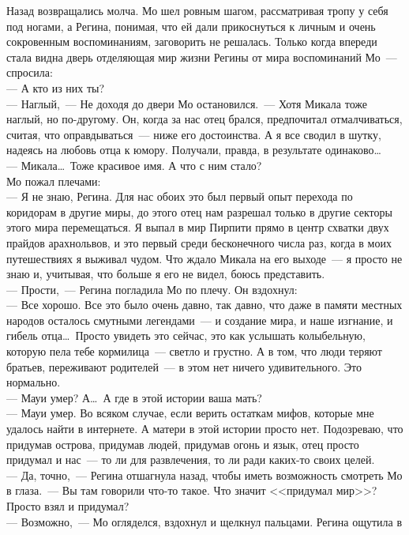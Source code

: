 Назад возвращались молча. Мо шел ровным шагом, рассматривая тропу у себя под 
ногами, а Регина, понимая, что ей дали прикоснуться к личным и очень 
сокровенным воспоминаниям, заговорить не решалась. Только когда впереди стала видна дверь 
отделяющая мир жизни Регины от мира воспоминаний Мо~--- спросила:\\
--- А кто из них ты?\\
--- Наглый,~--- Не доходя до двери Мо остановился.~--- Хотя Микала тоже наглый, 
но по-другому. Он, когда за нас отец брался, предпочитал отмалчиваться, считая, 
что оправдываться~--- ниже его достоинства. А я все сводил в шутку, надеясь на 
любовь отца к юмору. Получали, правда, в результате одинаково\ldots\\
--- Микала\ldots\ Тоже красивое имя. А что с ним стало?\\
Мо пожал плечами:\\
--- Я не знаю, Регина. Для нас обоих это был первый опыт перехода по коридорам в 
другие миры, до этого отец нам разрешал только в другие секторы этого мира 
перемещаться. Я выпал в мир Пирпити прямо в центр схватки двух прайдов 
арахнольвов, и это первый среди бесконечного числа раз, когда в моих 
путешествиях я выживал чудом. Что ждало Микала на его выходе~--- я просто не 
знаю и, учитывая, что больше я его не видел, боюсь представить.\\
--- Прости,~--- Регина погладила Мо по плечу. Он вздохнул:\\
--- Все хорошо. Все это было очень давно, так давно, что даже в памяти местных 
народов осталось смутными легендами~--- и создание мира, и наше изгнание, и 
гибель отца\ldots\ Просто увидеть это сейчас, это как услышать колыбельную, которую 
пела тебе кормилица~--- светло и грустно. А в том, что люди теряют братьев, 
переживают родителей~--- в этом нет ничего удивительного. Это нормально.\\
--- Мауи умер? А\ldots\ А где в этой истории ваша мать?\\
--- Мауи умер. Во всяком случае, если верить остаткам мифов, которые мне удалось 
найти в интернете. А матери в этой истории просто нет. Подозреваю, что придумав 
острова, придумав людей, придумав огонь и язык, отец просто придумал и нас~--- 
то ли для развлечения, то ли ради каких-то своих целей.\\
--- Да, точно,~--- Регина отшагнула назад, чтобы иметь возможность смотреть Мо в 
глаза.~--- Вы там говорили что-то такое. Что значит <<придумал мир>>? Просто 
взял и придумал?\\
--- Возможно,~--- Мо огляделся, вздохнул и щелкнул пальцами. Регина ощутила в 
